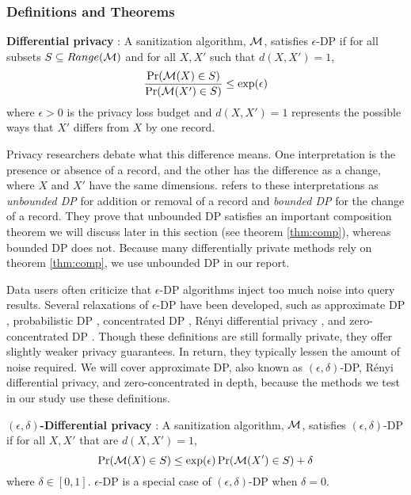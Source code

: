 \subsubsection{Definitions and Theorems}\label{subsec:def}
\begin{defn}\label{def:dp} \textbf{Differential privacy} \citep{dwork2006calibrating}:
A sanitization algorithm, $\mathcal{M}$, satisfies $\epsilon$-DP if for all subsets $S\subseteq Range(\mathcal{M})$ and for all $X,X'$ such that $d(X,X')=1$, 
    \begin{equation}\label{eqn:dp}
        \frac{\Pr(\mathcal{M}( X) \in S)}{ \Pr(\mathcal{M}( X')\in S)}\le \exp(\epsilon)
    \end{equation}
    \noindent where $\epsilon>0$ is the privacy loss budget and $d(X,X')=1$ represents the possible ways that $X'$ differs from $X$ by one record.
\end{defn}

Privacy researchers debate what this difference means. One interpretation is the presence or absence of a record, and the other has the difference as a change, where $X$ and $X'$ have the same dimensions. \citet{li2016differential} refers to these interpretations as \textit{unbounded DP} for addition or removal of a record and \textit{bounded DP} for the change of a record. They prove that unbounded DP satisfies an important composition theorem we will discuss later in this section (see theorem \ref{thm:comp}), whereas bounded DP does not. Because many differentially private methods rely on theorem \ref{thm:comp}, we use unbounded DP in our report.

Data users often criticize that $\epsilon$-DP algorithms inject too much noise into query results. Several relaxations of $\epsilon$-DP have been developed, such as approximate DP \citep{dwork2006our}, probabilistic DP \citep{machanavajjhala2008privacy}, concentrated DP \citep{dwork2016concentrated}, R\'enyi differential privacy \citep{mironov2017renyi}, and zero-concentrated DP \citep{bun2016concentrated}. Though these definitions are still formally private, they offer slightly weaker privacy guarantees. In return, they typically lessen the amount of noise required. We will cover approximate DP, also known as $(\epsilon, \delta)$-DP, R\'enyi differential privacy, and zero-concentrated in depth, because the methods we test in our study use these definitions.

\begin{defn}\label{def:adp} \textbf{$(\epsilon, \delta)$-Differential privacy} \citep{dwork2006our}:
A sanitization algorithm, $\mathcal{M}$, satisfies $(\epsilon, \delta)$-DP if for all $X, X'$ that are $d(X,X')=1$,
    \begin{equation}\label{eqn:adp}
        \Pr(\mathcal{M}( X) \in S)\le \exp(\epsilon) \Pr(\mathcal{M}( X')\in S) + \delta
    \end{equation}
    where $\delta\in [0,1]$. $\epsilon$-DP is a special case of $(\epsilon, \delta)$-DP when $\delta=0$.
\end{defn}

